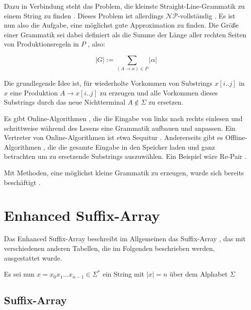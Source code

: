 Dazu in Verbindung steht das Problem, die kleinste Straight-Line-Grammatik zu einem String zu finden \cite{charikar_smallest_2005}. 
Dieses Problem ist allerdings $\mathcal{NP}$-vollständig \cite{charikar_smallest_2005}. Es ist nun also die Aufgabe, eine möglichst gute Approximation zu finden.
Die Größe einer Grammatik sei dabei definiert als die Summe der Länge aller rechten Seiten von Produktionsregeln in $P$ \cite{charikar_smallest_2005}, also:

\begin{equation*}
    |G| := \sum_{(A \rightarrow \alpha) \in P} |\alpha|
\end{equation*}

 Die grundlegende Idee ist, für wiederholte Vorkommen von Substrings $x[i..j]$ in $x$ eine Produktion $A \rightarrow x[i..j]$ zu erzeugen und alle Vorkommen dieses Substrings durch das neue Nichtterminal $A \notin \Sigma$ zu ersetzen.
 
 Es gibt Online-Algorithmen \cite{dinklage_compression_2017}, die die Eingabe von links nach rechts einlesen und schrittweise während des Lesens eine Grammatik aufbauen und anpassen. Ein Vertreter von Online-Algorithmen ist etwa Sequitur \cite{nevill-manning_identifying_1997}. 
 Andererseits gibt es Offline-Algorithmen \cite{dinklage_compression_2017}, die die gesamte Eingabe in den Speicher laden und ganz betrachten um zu ersetzende Substrings auszuwählen. Ein Beispiel wäre Re-Pair \cite{larsson_offline_1999}.
 
 Mit Methoden, eine möglichst kleine Grammatik zu erzeugen, wurde sich bereits beschäftigt \cite{benz_effective_2013, carrascosa_choosing_2010, charikar_smallest_2005}. 
 
\section{Enhanced Suffix-Array}

Das Enhanced Suffix-Array \cite{abouelhoda_replacing_2004} beschreibt im Allgemeinen das Suffix-Array \cite{manber_suffix_1993}, das mit verschiedenen anderen Tabellen, die im Folgenden beschrieben werden, ausgestattet wurde.

Es sei nun $x = x_0 x_1 \dots x_{n-1}\in \Sigma^*$ ein String mit $|x| = n$ über dem Alphabet $\Sigma$ 

\subsection{Suffix-Array}

